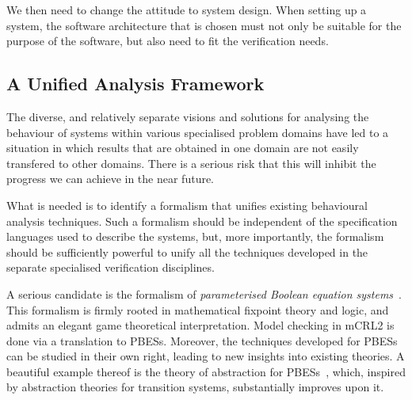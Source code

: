 \documentclass[sigplan,10pt,review]{acmart}\settopmatter{printfolios=true,printccs=false,printacmref=false}
\begin{document}
We then need to change the attitude to system design. When setting up a system, the  
software architecture that is chosen must not only be suitable for the purpose of the
software, but also need to  fit the verification needs.

\subsection{A Unified Analysis Framework}

The diverse, and relatively separate visions
and solutions for analysing the behaviour of systems within various
specialised problem domains have led to a situation in which results
that are obtained in one domain are not easily transfered to other
domains.  There is a serious risk that this will inhibit the progress
we can achieve in the near future.  

What is needed is to identify a formalism that unifies existing
behavioural analysis techniques.  Such a formalism should be
independent of the specification languages used to describe the
systems, but, more importantly, the formalism should be sufficiently
powerful to unify all the techniques developed in the separate
specialised verification disciplines.

A serious candidate is the formalism of \emph{parameterised
Boolean equation systems}~\cite{GrooteW05}. This formalism is firmly rooted in
mathematical fixpoint theory and logic, and admits an elegant game
theoretical interpretation.  Model checking in 
mCRL2 is done via a translation to PBESs.  Moreover, the techniques
developed for PBESs can be studied in their own right, leading to
new insights into existing theories. A beautiful example thereof
is the theory of abstraction for PBESs~\cite{CranenGWW15}, which,
inspired by abstraction theories for transition systems, substantially improves
upon it.
\end{document}
